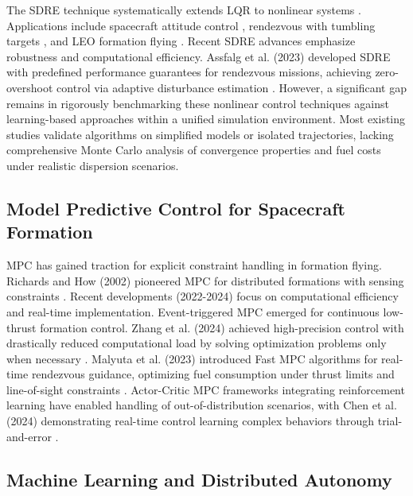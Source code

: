 \documentclass[10pt,letterpaper]{article}
\begin{document}
The SDRE technique systematically extends LQR to nonlinear systems \cite{cloutier1997sdre, mracek1998sdre}. Applications include spacecraft attitude control \cite{cimen2012sdre}, rendezvous with tumbling targets \cite{xin2011sdre}, and LEO formation flying \cite{bevilacqua2011sdre}. Recent SDRE advances emphasize robustness and computational efficiency. Assfalg et al. (2023) developed SDRE with predefined performance guarantees for rendezvous missions, achieving zero-overshoot control via adaptive disturbance estimation \cite{assfalg2023robust}. However, a significant gap remains in rigorously benchmarking these nonlinear control techniques against learning-based approaches within a unified simulation environment. Most existing studies validate algorithms on simplified models or isolated trajectories, lacking comprehensive Monte Carlo analysis of convergence properties and fuel costs under realistic dispersion scenarios.

\subsection{Model Predictive Control for Spacecraft Formation}

MPC has gained traction for explicit constraint handling in formation flying. Richards and How (2002) pioneered MPC for distributed formations with sensing constraints \cite{richards2002mpc}. Recent developments (2022-2024) focus on computational efficiency and real-time implementation. Event-triggered MPC emerged for continuous low-thrust formation control. Zhang et al. (2024) achieved high-precision control with drastically reduced computational load by solving optimization problems only when necessary \cite{zhang2024eventtriggered}. Malyuta et al. (2023) introduced Fast MPC algorithms for real-time rendezvous guidance, optimizing fuel consumption under thrust limits and line-of-sight constraints \cite{malyuta2023fastmpc}. Actor-Critic MPC frameworks integrating reinforcement learning have enabled handling of out-of-distribution scenarios, with Chen et al. (2024) demonstrating real-time control learning complex behaviors through trial-and-error \cite{chen2024actorcritic}.

\subsection{Machine Learning and Distributed Autonomy}
\end{document}
